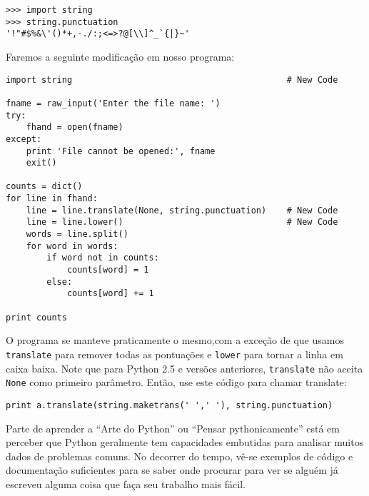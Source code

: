 \beforeverb
\begin{verbatim}
>>> import string
>>> string.punctuation
'!"#$%&\'()*+,-./:;<=>?@[\\]^_`{|}~'
\end{verbatim}
\afterverb
%
Faremos a seguinte modificação em nosso programa:

\beforeverb
\begin{verbatim}
import string                                          # New Code

fname = raw_input('Enter the file name: ')
try:
    fhand = open(fname)
except:
    print 'File cannot be opened:', fname
    exit()

counts = dict()
for line in fhand:
    line = line.translate(None, string.punctuation)    # New Code
    line = line.lower()                                # New Code
    words = line.split()
    for word in words:
        if word not in counts:
            counts[word] = 1
        else:
            counts[word] += 1

print counts
\end{verbatim}
\afterverb
%
O programa se manteve praticamente o mesmo,com a exceção de que usamos {\tt translate} para remover todas as pontuações e {\tt lower} para tornar a linha em caixa baixa.
Note que para Python 2.5 e versões anteriores, {\tt translate} não aceita {\tt None} como primeiro parâmetro. Então, use este código para chamar translate:

\beforeverb
\begin{verbatim}
print a.translate(string.maketrans(' ',' '), string.punctuation)
\end{verbatim}
\afterverb
%
Parte de aprender a ``Arte do Python'' ou ``Pensar pythonicamente'' está em
perceber que Python geralmente tem capacidades embutidas para analisar muitos
dados de problemas comuns. No decorrer do tempo, vê-se exemplos de código e
documentação suficientes para se saber onde procurar para ver se alguém já escreveu alguma coisa que faça seu trabalho mais fácil.

